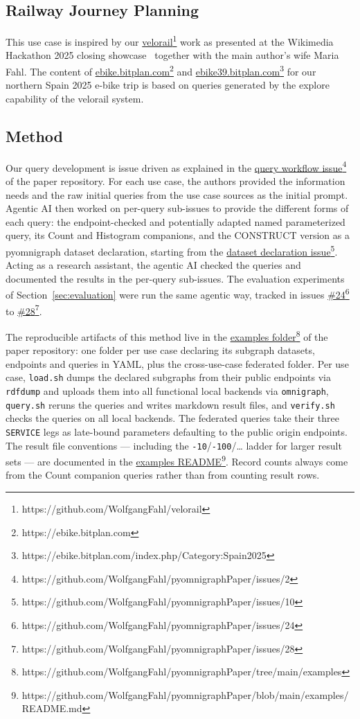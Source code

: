 \documentclass[
]{ceurart}
\newcommand{\footnotelink}[2]{\href{#1}{#2}\footnote{#1}}
\begin{document}
\subsection{Railway Journey Planning}
This use case is inspired by our \footnotelink{https://github.com/WolfgangFahl/velorail}{velorail} work as presented at the Wikimedia Hackathon 2025 closing showcase~\cite{wmhack2025showcase} together with the main author's wife Maria Fahl. The content of \footnotelink{https://ebike.bitplan.com}{ebike.bitplan.com} and \footnotelink{https://ebike.bitplan.com/index.php/Category:Spain2025}{ebike39.bitplan.com} for our northern Spain 2025 e-bike trip is based on queries generated by the explore capability of the velorail system.

\subsection{Method}\label{sec:method}
Our query development is issue driven as explained in the
\footnotelink{https://github.com/WolfgangFahl/pyomnigraphPaper/issues/2}{query workflow issue}
of the paper repository. For each use case, the authors provided the information
needs and the raw initial queries from the use case sources as the initial prompt.
Agentic AI then worked on per-query sub-issues to provide the different forms of
each query: the endpoint-checked and potentially adapted named parameterized
query, its Count and Histogram companions, and the CONSTRUCT version as a
pyomnigraph dataset declaration, starting from the
\footnotelink{https://github.com/WolfgangFahl/pyomnigraphPaper/issues/10}{dataset declaration issue}.
Acting as a research assistant, the agentic AI checked the queries and documented
the results in the per-query sub-issues. The evaluation experiments of
Section~\ref{sec:evaluation} were run the same agentic way, tracked in issues
\footnotelink{https://github.com/WolfgangFahl/pyomnigraphPaper/issues/24}{\#24} to
\footnotelink{https://github.com/WolfgangFahl/pyomnigraphPaper/issues/28}{\#28}.

The reproducible artifacts of this method live in the
\footnotelink{https://github.com/WolfgangFahl/pyomnigraphPaper/tree/main/examples}{examples folder}
of the paper repository: one folder per use case declaring its subgraph
datasets, endpoints and queries in YAML, plus the cross-use-case federated
folder. Per use case, \texttt{load.sh} dumps the declared subgraphs from their
public endpoints via \texttt{rdfdump} and uploads them into all functional
local backends via \texttt{omnigraph}, \texttt{query.sh} reruns the queries
and writes markdown result files, and \texttt{verify.sh} checks the queries on
all local backends. The federated queries take their three \texttt{SERVICE}
legs as late-bound parameters defaulting to the public origin endpoints.
The result file conventions --- including the
\texttt{-10}/\texttt{-100}/\ldots{} ladder for larger result sets --- are
documented in the
\footnotelink{https://github.com/WolfgangFahl/pyomnigraphPaper/blob/main/examples/README.md}{examples README}.
Record counts always come from the Count companion queries rather than from
counting result rows.
\end{document}
